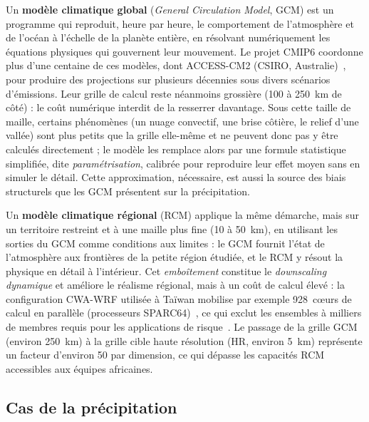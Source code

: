 Un \textbf{modèle climatique global} (\emph{General Circulation Model}, GCM) est un programme qui reproduit, heure par heure, le comportement de l'atmosphère et de l'océan à l'échelle de la planète entière, en résolvant numériquement les équations physiques qui gouvernent leur mouvement. Le projet CMIP6 coordonne plus d'une centaine de ces modèles, dont ACCESS-CM2 (CSIRO, Australie)~\cite{eyring_cmip6_2016}, pour produire des projections sur plusieurs décennies sous divers scénarios d'émissions. Leur grille de calcul reste néanmoins grossière (100 à 250~km de côté) : le coût numérique interdit de la resserrer davantage. Sous cette taille de maille, certains phénomènes (un nuage convectif, une brise côtière, le relief d'une vallée) sont plus petits que la grille elle-même et ne peuvent donc pas y être calculés directement ; le modèle les remplace alors par une formule statistique simplifiée, dite \emph{paramétrisation}, calibrée pour reproduire leur effet moyen sans en simuler le détail. Cette approximation, nécessaire, est aussi la source des biais structurels que les GCM présentent sur la précipitation.

Un \textbf{modèle climatique régional} (RCM) applique la même démarche, mais sur un territoire restreint et à une maille plus fine (10 à 50~km), en utilisant les sorties du GCM comme conditions aux limites : le GCM fournit l'état de l'atmosphère aux frontières de la petite région étudiée, et le RCM y résout la physique en détail à l'intérieur. Cet \emph{emboîtement} constitue le \emph{downscaling dynamique} et améliore le réalisme régional, mais à un coût de calcul élevé : la configuration CWA-WRF utilisée à Taïwan mobilise par exemple 928~cœurs de calcul en parallèle (processeurs SPARC64)~\cite{mardani_corrdiff_2023}, ce qui exclut les ensembles à milliers de membres requis pour les applications de risque~\cite{hobeichi_ml_downscaling_2023}. Le passage de la grille GCM (environ 250~km) à la grille cible haute résolution (HR, environ 5~km) représente un facteur d'environ 50 par dimension, ce qui dépasse les capacités RCM accessibles aux équipes africaines.

\subsection{Cas de la précipitation}
\label{ssec:cas-precipitation}

